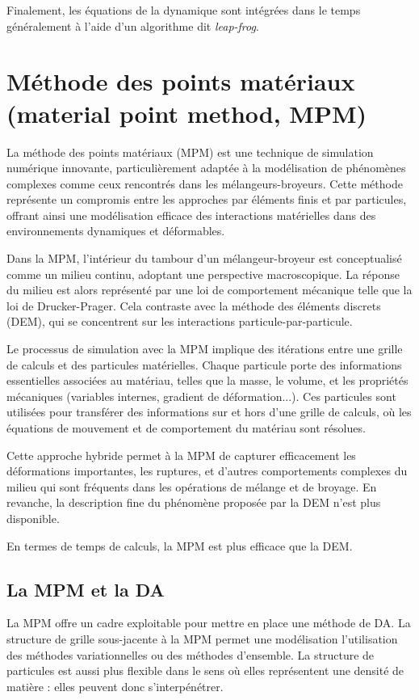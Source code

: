Finalement, les équations de la dynamique sont intégrées dans le temps généralement à l'aide d'un algorithme dit \textit{leap-frog}.

\section{Méthode des points matériaux (material point method, MPM)}

La méthode des points matériaux (MPM) est une technique de simulation numérique innovante, particulièrement adaptée à la modélisation de phénomènes complexes comme ceux rencontrés dans les mélangeurs-broyeurs. Cette méthode représente un compromis entre les approches par éléments finis et par particules, offrant ainsi une modélisation efficace des interactions matérielles dans des environnements dynamiques et déformables.

Dans la MPM, l'intérieur du tambour d'un mélangeur-broyeur est conceptualisé comme un milieu continu, adoptant une perspective macroscopique. La réponse du milieu est alors représenté par une loi de comportement mécanique telle que la loi de Drucker-Prager. Cela contraste avec la méthode des éléments discrets (DEM), qui se concentrent sur les interactions particule-par-particule.

Le processus de simulation avec la MPM implique des itérations entre une grille de calculs et des particules matérielles. Chaque particule porte des informations essentielles associées au matériau, telles que la masse, le volume, et les propriétés mécaniques (variables internes, gradient de déformation...). Ces particules sont utilisées pour transférer des informations sur et hors d'une grille de calculs, où les équations de mouvement et de comportement du matériau sont résolues.

Cette approche hybride permet à la MPM de capturer efficacement les déformations importantes, les ruptures, et d'autres comportements complexes du milieu qui sont fréquents dans les opérations de mélange et de broyage. En revanche, la description fine du phénomène proposée par la DEM n'est plus disponible.

En termes de temps de calculs, la MPM est plus efficace que la DEM.

\subsection{La MPM et la DA}
La MPM offre un cadre exploitable pour mettre en place une méthode de DA.
La structure de grille sous-jacente à la MPM permet une modélisation l'utilisation des méthodes variationnelles ou des méthodes d'ensemble. La structure de particules est aussi plus flexible dans le sens où elles représentent une densité de matière : elles peuvent donc s'interpénétrer.

